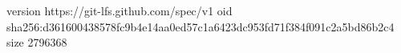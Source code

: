version https://git-lfs.github.com/spec/v1
oid sha256:d361600438578fc9b4e14aa0ed57c1a6423dc953fd71f384f091c2a5bd86b2c4
size 2796368
